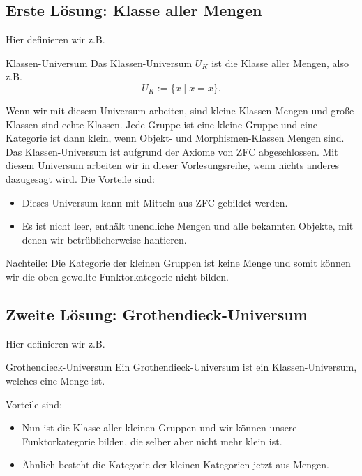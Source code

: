 \documentclass[a4paper]{amsart}
\theoremstyle{definition}
\begin{document}
\subsection{Erste Lösung: Klasse aller Mengen}
Hier definieren wir z.B.
\begin{Definition}{Klassen-Universum}
   Das Klassen-Universum $U_K$ ist die Klasse aller Mengen, also z.B. 
   \begin{equation}
      U_K := \{ x \mid x = x \}.
   \end{equation}
\end{Definition}
Wenn wir mit diesem Universum arbeiten, sind kleine Klassen Mengen und große Klassen sind echte Klassen. Jede Gruppe ist eine kleine Gruppe und eine Kategorie ist dann klein, wenn Objekt- und Morphismen-Klassen Mengen sind. Das Klassen-Universum ist aufgrund der Axiome von ZFC abgeschlossen. Mit diesem Universum arbeiten wir in dieser Vorlesungsreihe, wenn nichts anderes dazugesagt wird. Die Vorteile sind:
\begin{itemize}
   \item Dieses Universum kann mit Mitteln aus ZFC gebildet werden.
   \item Es ist nicht leer, enthält unendliche Mengen und alle bekannten Objekte, mit denen wir betrüblicherweise hantieren.
\end{itemize}

Nachteile: Die Kategorie der kleinen Gruppen ist keine Menge und somit können wir die oben gewollte Funktorkategorie nicht bilden.

\subsection{Zweite Lösung: Grothendieck-Universum}
Hier definieren wir z.B.
\begin{Definition}{Grothendieck-Universum}
   Ein Grothendieck-Universum ist ein Klassen-Universum, welches eine Menge ist.
\end{Definition}
Vorteile sind:
\begin{itemize}
   \item Nun ist die Klasse aller kleinen Gruppen und wir können unsere Funktorkategorie bilden, die selber aber nicht mehr klein ist.
   \item Ähnlich besteht die Kategorie der kleinen Kategorien jetzt aus Mengen.
\end{itemize}
\end{document}
